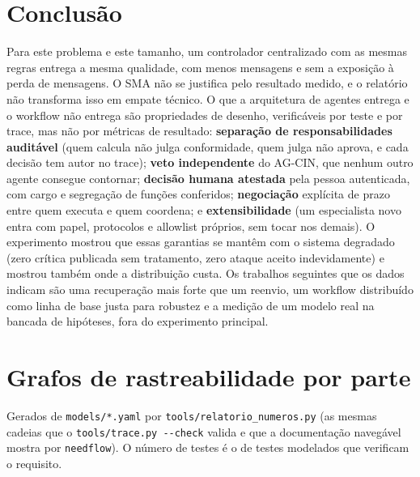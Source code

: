 \documentclass[10pt,a4paper]{article}
\newcommand{\code}[1]{\texttt{#1}}
\begin{document}
\section{Conclusão}
Para este problema e este tamanho, um controlador centralizado com as mesmas regras entrega a mesma qualidade, com menos
mensagens e sem a exposição à perda de mensagens. O SMA não se justifica pelo resultado medido, e o relatório não
transforma isso em empate técnico. O que a arquitetura de agentes entrega e o workflow não entrega são propriedades de
desenho, verificáveis por teste e por trace, mas não por métricas de resultado: \textbf{separação de responsabilidades
auditável} (quem calcula não julga conformidade, quem julga não aprova, e cada decisão tem autor no trace);
\textbf{veto independente} do AG-CIN, que nenhum outro agente consegue contornar; \textbf{decisão humana atestada} pela
pessoa autenticada, com cargo e segregação de funções conferidos; \textbf{negociação} explícita de prazo entre quem
executa e quem coordena; e \textbf{extensibilidade} (um especialista novo entra com papel, protocolos e allowlist
próprios, sem tocar nos demais). O experimento mostrou que essas garantias se mantêm com o sistema degradado (zero
crítica publicada sem tratamento, zero ataque aceito indevidamente) e mostrou também onde a distribuição custa. Os
trabalhos seguintes que os dados indicam são uma recuperação mais forte que um reenvio, um workflow distribuído como
linha de base justa para robustez e a medição de um modelo real na bancada de hipóteses, fora do experimento principal.

\clearpage
\appendix
\section{Grafos de rastreabilidade por parte}\label{ap:trace}
Gerados de \code{models/*.yaml} por \code{tools/relatorio\_numeros.py} (as mesmas cadeias que o \code{tools/trace.py
-{}-check} valida e que a documentação navegável mostra por \code{needflow}). O número de testes é o de testes modelados
que verificam o requisito.



\clearpage
\printbibliography[heading=bibintoc, title={Referências}]
\clearpage
\end{document}
